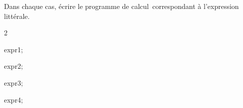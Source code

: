 \documentclass[exercice]{thedocument}%
\begin{document}
%
\smallskip\par\noindent Dans chaque cas, écrire le programme de
calcul~correspondant à l'expression littérale.
\begin{enumerate}
    \begin{multicols}{2}
        \item \<expr1;
        \item \<expr2;
        \columnbreak
        \item \<expr3;
        \item \<expr4;
    \end{multicols}
\end{enumerate}
\end{document}
